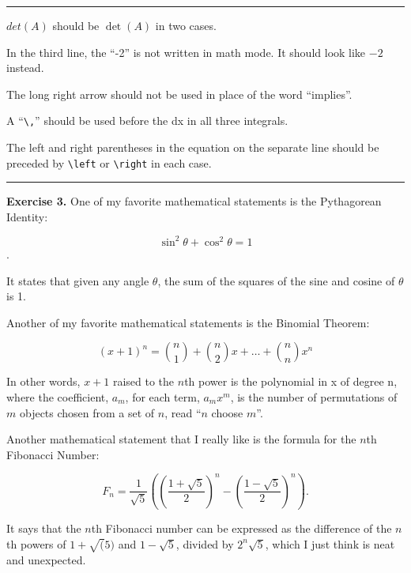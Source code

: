 \documentclass{report}
\begin{document}
\rule{\textwidth}{0.01ex}

$det(A)$ should be $\det(A)$ in two cases.

In the third line, the ``-2'' is not written in math mode. It should look like $-2$ instead.

The long right arrow should not be used in place of the word ``implies''.

A ``\verb#\,#'' should be used before the dx in all three integrals.

The left and right parentheses in the equation on the separate line should be preceded by \verb#\left# or \verb#\right# in each case.

\rule{\textwidth}{0.01ex}

\textbf{Exercise 3.} One of my favorite mathematical statements is the Pythagorean Identity:

\[ \sin^{2} \theta{} + \cos^{2} \theta{} = 1 \].

It states that given any angle $\theta{}$, the sum of the squares of the sine and cosine of $\theta$ is 1.

Another of my favorite mathematical statements is the Binomial Theorem:

\[ \left ( x + 1 \right )^{n} = \binom{n}{1} + \binom{n}{2}x + \ldots{} + \binom{n}{n}x^{n} \]

In other words, $x + 1$ raised to the $n$th power is the polynomial in x of degree n, where the coefficient, $a_{m}$, for each term, $a_{m}x^{m}$, is the number of permutations of $m$ objects chosen from a set of $n$, read ``$n$ choose $m$''.

Another mathematical statement that I really like is the formula for the $n$th Fibonacci Number:

\[ F_{n} = \frac{1}{\sqrt{5}}\left ( \left ( \frac{1 + \sqrt{5}}{2} \right )^{n}-\left (\frac{1-\sqrt{5}}{2} \right )^{n} \right )\text{.} \]

It says that the $n$th Fibonacci number can be expressed as the difference of the $n$th powers of $1 + \sqrt(5)$ and $1 - \sqrt{5}$, divided by $2^{n}\sqrt{5}$, which I just think is neat and unexpected.
\end{document}
